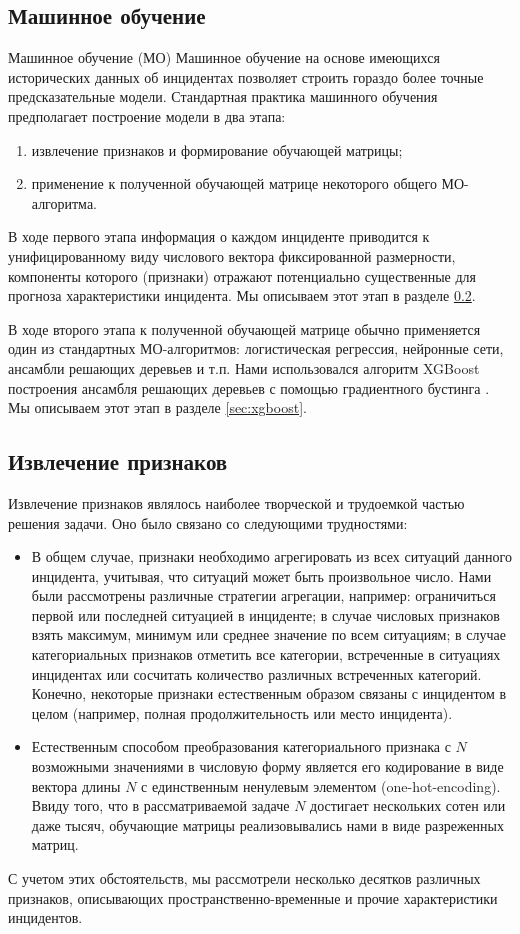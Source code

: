 \subsection{Машинное обучение}
Машинное обучение (МО) Машинное обучение на основе имеющихся исторических данных об инцидентах позволяет строить гораздо более точные предсказательные модели. Стандартная практика машинного обучения \cite{hastie01statisticallearning, Mitchell:1997:ML:541177, scikit-learn} предполагает построение модели в два этапа:
\begin{enumerate}
\item извлечение признаков и формирование обучающей матрицы;
\item применение к полученной обучающей матрице некоторого общего МО-алгоритма.
\end{enumerate}
В ходе первого этапа информация о каждом инциденте приводится к унифицированному виду числового вектора фиксированной размерности, компоненты которого (признаки) отражают потенциально существенные для прогноза характеристики инцидента. Мы описываем этот этап в разделе \ref{sec:feature_extraction}.

В ходе второго этапа к полученной обучающей матрице обычно применяется один из стандартных МО-алгоритмов: логистическая регрессия, нейронные сети, ансамбли решающих деревьев и т.п. Нами использовался алгоритм XGBoost построения ансамбля решающих деревьев с помощью градиентного бустинга \cite{chen2016xgboost}. Мы описываем этот этап в разделе \ref{sec:xgboost}.

\subsection{Извлечение признаков}\label{sec:feature_extraction}
Извлечение признаков являлось наиболее творческой и трудоемкой частью решения задачи. Оно было связано со следующими трудностями:
\begin{itemize}
\item В общем случае, признаки необходимо агрегировать из всех ситуаций данного инцидента, учитывая, что ситуаций может быть произвольное число. Нами были рассмотрены различные стратегии агрегации, например: ограничиться первой или последней ситуацией в инциденте; в случае числовых признаков взять максимум, минимум или среднее значение по всем ситуациям; в случае категориальных признаков отметить все категории, встреченные в ситуациях инцидентах или сосчитать количество различных встреченных категорий. Конечно, некоторые признаки естественным образом связаны с инцидентом в целом (например, полная продолжительность или место инцидента).
\item Естественным способом преобразования категориального признака с $N$ возможными значениями в числовую форму является его кодирование в виде вектора длины $N$ с единственным ненулевым элементом (one-hot-encoding). Ввиду того, что в рассматриваемой задаче $N$ достигает нескольких сотен или даже тысяч,  обучающие матрицы реализовывались нами в виде разреженных матриц.
\end{itemize}
С учетом этих обстоятельств, мы рассмотрели несколько десятков различных признаков, описывающих пространственно-временные и прочие характеристики инцидентов.

